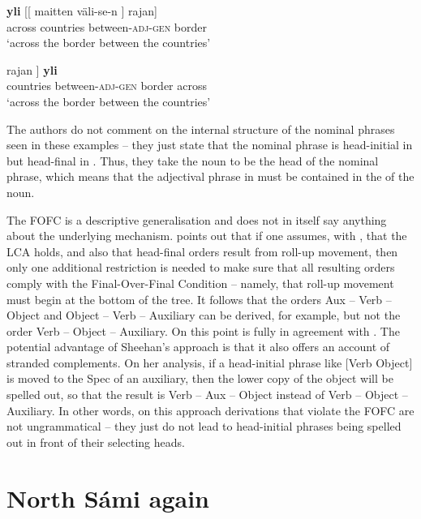 \documentclass[output=paper]{LSP/langsci}
\begin{document}
\ea%
    \label{ex:julien:24}
  \ea\label{ex:julien:24a}
\gll    \textbf{yli}      [[ maitten  väli-se-n        ]  rajan]\\
      across   {} countries  between-\textsc{adj-gen} {}  border\\
\glt       ‘across the border between the countries’

\ex\label{ex:julien:24b}
\gll\relax  [[ maitten  väli-se-n        ]  rajan  ]  \textbf{yli}\\
       {} countries  between-\textsc{adj-gen} {}  border {} across\\
\glt        ‘across the border between the countries’
\z
\z

The authors do not comment on the internal structure of the nominal phrases seen in these examples – they just state that the nominal phrase is head-initial in  but head-final in . Thus, they take the noun to be the head of the nominal phrase, which means that the adjectival phrase in  must be contained in the  of the noun.


The FOFC is a descriptive generalisation and does not in itself say anything about the underlying mechanism. \citet{Sheehan2009} points out that if one assumes, with \citet{Kayne1994}, that the LCA holds, and also that head-final orders result from roll-up movement, then only one additional restriction is needed to make sure that all resulting orders comply with the Final-Over-Final Condition – namely, that roll-up movement must begin at the bottom of the tree. It follows that the orders Aux – Verb – Object and Object – Verb – Auxiliary can be derived, for example, but not the order Verb – Object – Auxiliary. On this point \citet{Sheehan2009} is fully in agreement with \citet{BiberauerEtAl2014syntactic}. The potential advantage of Sheehan’s approach is that it also offers an account of stranded complements. On her analysis, if a head-initial phrase like [Verb Object] is moved to the Spec of an auxiliary, then the lower copy of the object will be spelled out, so that the result is Verb – Aux – Object instead of Verb – Object – Auxiliary. In other words, on this approach derivations that violate the FOFC are not ungrammatical – they just do not lead to head-initial phrases being spelled out in front of their selecting heads.


\section{North Sámi again} %
\end{document}
